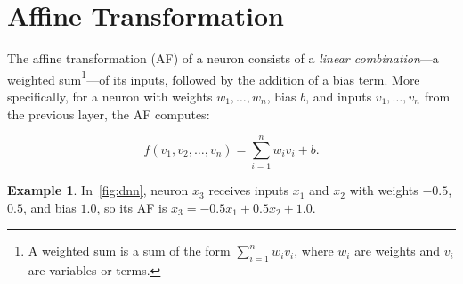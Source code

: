 \documentclass[oneside,11pt,dvipsnames]{book}
\numberwithin{equation}{section}
\theoremstyle{definition}
\newtheorem{example}{Example}[section]
\theoremstyle{remark}
\begin{document}
\section{Affine Transformation}\label{sec:affine}

The affine transformation (AF) of a neuron consists of a \emph{linear combination}---a weighted sum\footnote{A weighted sum is a sum of the form \( \sum_{i=1}^{n} w_i v_i \), where \(w_i\) are weights and \(v_i\) are variables or terms.}---of its inputs, followed by the addition of a bias term. More specifically, for a neuron with weights \(w_1, \dots, w_n\), bias \(b\), and inputs \(v_1, \dots, v_n\) from the previous layer, the AF computes:

\begin{equation}\label{eq:affine}
    f(v_1, v_2, \dots,v_n) = \sum_{i=1}^{n} w_i v_i + b.
\end{equation}


\begin{example}
In~\autoref{fig:dnn}, neuron \(x_3\) receives inputs \(x_1\) and \(x_2\) with weights \(-0.5\), \(0.5\), and bias \(1.0\), so its AF is $x_3 = -0.5 x_1 + 0.5 x_2 + 1.0$.
\end{example}






\end{document}
